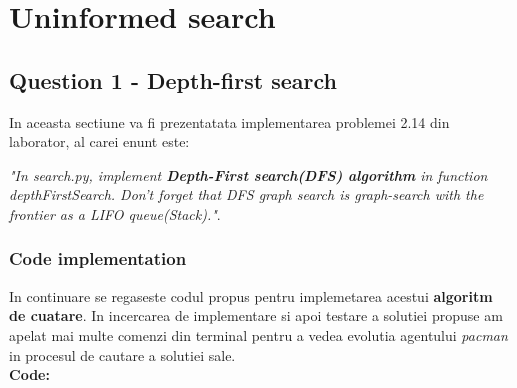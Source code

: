 \section{Uninformed search}

\subsection{Question 1 - Depth-first search}
In aceasta sectiune va fi prezentatata implementarea problemei 2.14 din laborator, al carei enunt este: \newline


\textit{"In search.py, implement \textbf{Depth-First search(DFS) algorithm} in  function \textit{depthFirstSearch}. Don’t  forget that DFS graph search is graph-search with the frontier as a LIFO queue(Stack)."}.


\subsubsection{Code implementation}
In continuare se regaseste codul propus pentru implemetarea acestui \textbf{algoritm de cuatare}. In incercarea de implementare si apoi testare a solutiei propuse am apelat mai multe comenzi din terminal pentru a vedea evolutia agentului \textit{pacman} in procesul de cautare a solutiei sale.   \newline\newline\newline    \\

\textbf{Code:}
\inputminted[linenos]{python}{code/01_dfs.py}

